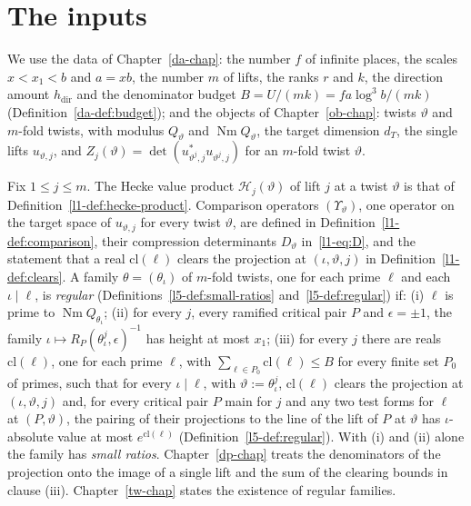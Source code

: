 \documentclass[reqno]{amsart}
\newcounter{chap}
\theoremstyle{definition}
\theoremstyle{plain}
\newcommand{\Hc}{{\mathcal{H}}}
\newcommand{\Nm}{\operatorname{Nm}}
\newcommand{\hdir}{h_{\mathrm{dir}}}
\begin{document}
\section{The inputs}\label{sec:general}

We use the data of Chapter~\ref{da-chap}: the number \(f\) of infinite places, the scales \(x < x_1 < b\) and \(a = xb\), the number \(m\) of lifts, the ranks \(r\) and \(k\), the direction amount \(\hdir\) and the denominator budget \(B = U/(mk) = fa\log^3 b/(mk)\) (Definition~\ref{da-def:budget}); and the objects of Chapter~\ref{ob-chap}: twists \(\vartheta\) and \(m\)-fold twists, with modulus \(Q_\vartheta\) and \(\Nm Q_\vartheta\), the target dimension \(d_T\), the single lifts \(u_{\vartheta,j}\), and \(Z_j(\vartheta) = \det(u_{\vartheta^j,j}^*u_{\vartheta^j,j})\) for an \(m\)-fold twist \(\vartheta\).

Fix \(1 \le j \le m\).  The Hecke value product \(\Hc_j(\vartheta)\) of lift \(j\) at a twist \(\vartheta\) is that of Definition~\ref{l1-def:hecke-product}.  Comparison operators \((\Upsilon_\vartheta)\), one operator on the target space of \(u_{\vartheta,j}\) for every twist \(\vartheta\), are defined in Definition~\ref{l1-def:comparison}, their compression determinants \(D_\vartheta\) in~\eqref{l1-eq:D}, and the statement that a real \(\mathrm{cl}(\ell)\) clears the projection at \((\iota, \vartheta, j)\) in Definition~\ref{l1-def:clears}.  A family \(\theta = (\theta_\iota)\) of \(m\)-fold twists, one for each prime \(\ell\) and each \(\iota \mid \ell\), is \emph{regular} (Definitions~\ref{l5-def:small-ratios} and~\ref{l5-def:regular}) if: (i) \(\ell\) is prime to \(\Nm Q_{\theta_\iota}\); (ii) for every \(j\), every ramified critical pair \(P\) and \(\epsilon = \pm 1\), the family \(\iota \mapsto R_P(\theta_\iota^j, \epsilon)^{-1}\) has height at most \(x_1\); (iii) for every \(j\) there are reals \(\mathrm{cl}(\ell)\), one for each prime \(\ell\), with \(\sum_{\ell \in P_0}\mathrm{cl}(\ell) \le B\) for every finite set \(P_0\) of primes, such that for every \(\iota\mid\ell\), with \(\vartheta:=\theta_\iota^j\), \(\mathrm{cl}(\ell)\) clears the projection at \((\iota,\vartheta,j)\) and, for every critical pair \(P\) main for \(j\) and any two test forms for \(\ell\) at \((P,\vartheta)\), the pairing of their projections to the line of the lift of \(P\) at \(\vartheta\) has \(\iota\)-absolute value at most \(e^{\mathrm{cl}(\ell)}\) (Definition~\ref{l5-def:regular}).  With (i) and (ii) alone the family has \emph{small ratios}.  Chapter~\ref{dp-chap} treats the denominators of the projection onto the image of a single lift and the sum of the clearing bounds in clause (iii).  Chapter~\ref{tw-chap} states the existence of regular families.
\end{document}
